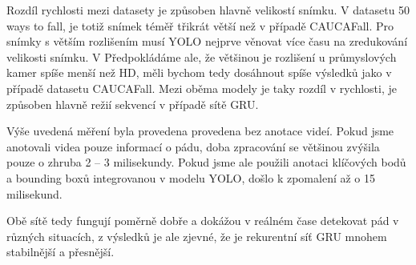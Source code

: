 Rozdíl rychlosti mezi datasety je způsoben hlavně velikostí snímku. V datasetu
50 ways to fall, je totiž snímek téměř třikrát větší než v případě CAUCAFall.
Pro snímky s větším rozlišením musí YOLO nejprve věnovat více času na
zredukování velikosti snímku. V Předpokládáme ale, že většinou je rozlišení u
průmyslových kamer spíše menší než HD, měli bychom tedy dosáhnout spíše
výsledků jako v případě datasetu CAUCAFall. Mezi oběma modely je taky rozdíl v
rychlosti, je způsoben hlavně režií sekvencí v případě sítě GRU.

Výše uvedená měření byla provedena provedena bez anotace videí. Pokud jsme
anotovali videa pouze informací o pádu, doba zpracování se většinou zvýšila
pouze o zhruba 2 – 3 milisekundy. Pokud jsme ale použili anotaci klíčových bodů
a bounding boxů integrovanou v modelu YOLO, došlo k zpomalení až o 15 milisekund.

Obě sítě tedy fungují poměrně dobře a dokážou v reálném čase detekovat pád v
různých situacích, z výsledků je ale zjevné, že je rekurentní síť GRU mnohem
stabilnější a přesnější.


\endinput